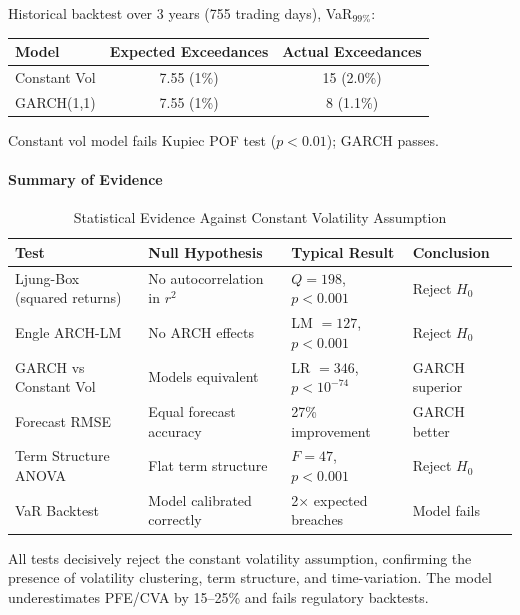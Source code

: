 Historical backtest over 3 years (755 trading days), VaR$_{99\%}$:

\begin{center}
	\begin{tabular}{|l|c|c|}
		\hline
		\textbf{Model} & \textbf{Expected Exceedances} & \textbf{Actual Exceedances} \\
		\hline
		Constant Vol & 7.55 (1\%) & 15 (2.0\%) \\
		GARCH(1,1) & 7.55 (1\%) & 8 (1.1\%) \\
		\hline
	\end{tabular}
\end{center}

Constant vol model fails Kupiec POF test ($p < 0.01$); GARCH passes.

\paragraph{Summary of Evidence}

\begin{table}[h!]
	\centering
	\small
	\begin{tabular}{|p{3.5cm}|p{4cm}|p{4cm}|p{2cm}|}
		\hline
		\textbf{Test} & \textbf{Null Hypothesis} & \textbf{Typical Result} & \textbf{Conclusion} \\
		\hline
		Ljung-Box (squared returns) & No autocorrelation in $r^2$ & $Q = 198$, $p < 0.001$ & Reject $H_0$ \\
		\hline
		Engle ARCH-LM & No ARCH effects & LM $= 127$, $p < 0.001$ & Reject $H_0$ \\
		\hline
		GARCH vs Constant Vol & Models equivalent & LR $= 346$, $p < 10^{-74}$ & GARCH superior \\
		\hline
		Forecast RMSE & Equal forecast accuracy & 27\% improvement & GARCH better \\
		\hline
		Term Structure ANOVA & Flat term structure & $F = 47$, $p < 0.001$ & Reject $H_0$ \\
		\hline
		VaR Backtest & Model calibrated correctly & 2× expected breaches & Model fails \\
		\hline
	\end{tabular}
	\caption{Statistical Evidence Against Constant Volatility Assumption}
\end{table}

All tests decisively reject the constant volatility assumption, confirming the presence of volatility clustering, term structure, and time-variation. The model underestimates PFE/CVA by 15--25\% and fails regulatory backtests.
\newpage








